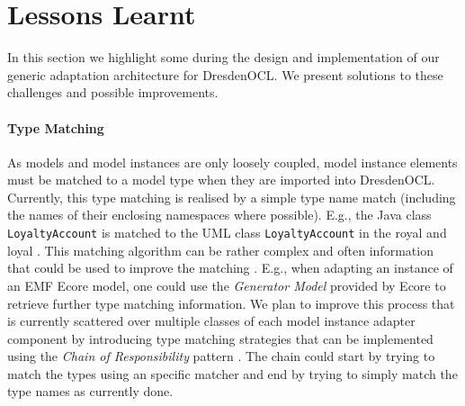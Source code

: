 \section{Lessons Learnt}
\label{sec:lessons}

  In this section we highlight some  during the design
  and implementation of our generic adaptation architecture for DresdenOCL.
  We present  solutions to these challenges and possible improvements.

	\paragraph{Type Matching\add{:}}
	As models and model instances are only loosely 
	coupled, model instance elements must be matched to a model type
	when they are imported into DresdenOCL. Currently, this type matching is realised by a simple type name match (including the names of 
	their enclosing namespaces where possible). E.g., the Java class \texttt{LoyaltyAccount} is
	matched to the UML class \texttt{LoyaltyAccount} in the royal and loyal .
	This matching algorithm can be rather complex and often information  that could be 
	used to improve the matching . E.g., when adapting an instance of an EMF 
	Ecore model, one could use the \emph{Generator Model} provided by Ecore to
	retrieve further type matching information. We plan to improve this process
	that is currently scattered over multiple classes of each model instance 
	adapter component by introducing type matching strategies that 
	can be implemented using the \emph{Chain of Responsibility} 
	pattern \cite{gamma:dp}. The chain could start by trying to match the 
	types using an  specific matcher and end by trying to 
	simply match the type names as currently done.
	
